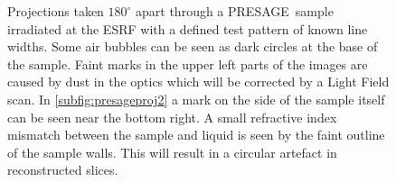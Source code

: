 	
	

	\begin{figure}[H]
		\centering
		\caption{Projections taken $180^{\circ}$ apart through a PRESAGE\texttrademark ~sample irradiated at the ESRF with a defined test pattern of known line widths. Some air bubbles can be seen as dark circles at the base of the sample. Faint marks in the upper left parts of the images are caused by dust in the optics which will be corrected by a Light Field scan. In \ref{subfig:presageproj2} a mark on the side of the sample itself can be seen near the bottom right. A small refractive index mismatch between the sample and liquid is seen by the faint outline of the sample walls. This will result in a circular artefact in reconstructed slices.  }
		\label{fig:presage_projections}
	\end{figure}



